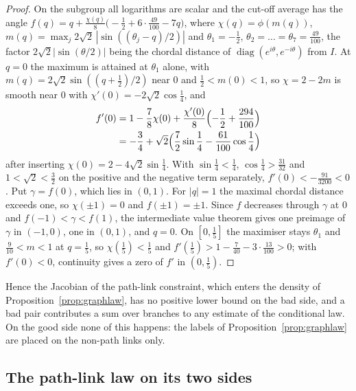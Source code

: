 \documentclass[11pt]{amsart}
\theoremstyle{definition}
\theoremstyle{remark}
\numberwithin{equation}{section}
\begin{document}
\begin{proof}
On the subgroup all logarithms are scalar and the cut-off average has the
angle $f(q)=q+\frac{\chi(q)}8\bigl(-\frac12+6\cdot\frac{49}{100}-7q\bigr)$,
where $\chi(q)=\phi(m(q))$, $m(q)=\max_j2\sqrt2\,|\sin((\theta_j-q)/2)|$
and $\theta_1=-\frac12$, $\theta_2=\dots=\theta_7=\frac{49}{100}$, the
factor $2\sqrt2|\sin(\theta/2)|$ being the chordal distance of
$\operatorname{diag}(e^{i\theta},e^{-i\theta})$ from $I$. At $q=0$ the
maximum is attained at $\theta_1$ alone, with $m(q)=2\sqrt2\sin((q+\frac12)
/2)$ near $0$ and $\frac12<m(0)<1$, so $\chi=2-2m$ is smooth near $0$ with
$\chi'(0)=-2\sqrt2\cos\frac14$, and
\[
\begin{split}
f'(0)&=1-\frac78\chi(0)+\frac{\chi'(0)}8\Bigl(-\frac12+\frac{294}{100}\Bigr)\\
&=-\frac34+\sqrt2\Bigl(\frac72\sin\frac14-\frac{61}{100}\cos\frac14\Bigr)
\end{split}
\]
after inserting $\chi(0)=2-4\sqrt2\sin\frac14$. With $\sin\frac14<\frac14$,
$\cos\frac14>\frac{31}{32}$ and $1<\sqrt2<\frac32$ on the positive and the
negative term separately, $f'(0)<-\frac{91}{3200}<0$. Put $\gamma=f(0)$,
which lies in $(0,1)$. For $|q|=1$ the maximal chordal distance exceeds
one, so $\chi(\pm1)=0$ and $f(\pm1)=\pm1$. Since $f$ decreases through
$\gamma$ at $0$ and $f(-1)<\gamma<f(1)$, the intermediate value theorem
gives one preimage of $\gamma$ in $(-1,0)$, one in $(0,1)$, and $q=0$. On
$[0,\frac15]$ the maximiser stays $\theta_1$ and $\frac9{10}<m<1$ at
$q=\frac15$, so $\chi(\frac15)<\frac15$ and $f'(\frac15)>1-\frac7{40}-
3\cdot\frac{13}{100}>0$; with $f'(0)<0$, continuity gives a zero of $f'$ in
$(0,\frac15)$.
\end{proof}

Hence the Jacobian of the path-link constraint, which enters the density of
Proposition~\ref{prop:graphlaw}, has no positive lower bound on the bad
side, and a bad pair contributes a sum over branches to any estimate of
the conditional law. On the good side none of this happens: the labels
of Proposition~\ref{prop:graphlaw} are placed on the non-path links only.

\subsection{The path-link law on its two sides}\label{ssec:pathlaw}
\end{document}
